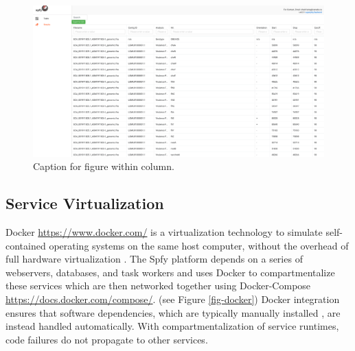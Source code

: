 \documentclass{article}
\begin{document}
\begin{figure}[t]
\begin{center}
\includegraphics[width=\textwidth]{images/tables.png}
\end{center}
\caption{Caption for figure within column.}
\label{fig-tables}
\end{figure}

\subsection{Service Virtualization}



Docker \url{https://www.docker.com/} is a virtualization technology to simulate self-contained operating systems on the same host computer, without the overhead of full hardware virtualization \cite{felter2015updated}.
The Spfy platform depends on a series of webservers, databases, and task workers and uses Docker to compartmentalize these services which are then networked together using Docker-Compose \url{https://docs.docker.com/compose/}.
(see Figure \ref{fig-docker})
Docker integration ensures that software dependencies, which are typically manually installed \cite{doi:10.1093/bioinformatics/btu153,laing2010pan,inouye2014srst2,naccache2014cloud}, are instead handled automatically. With compartmentalization of service runtimes, code failures do not propagate to other services.
\end{document}
